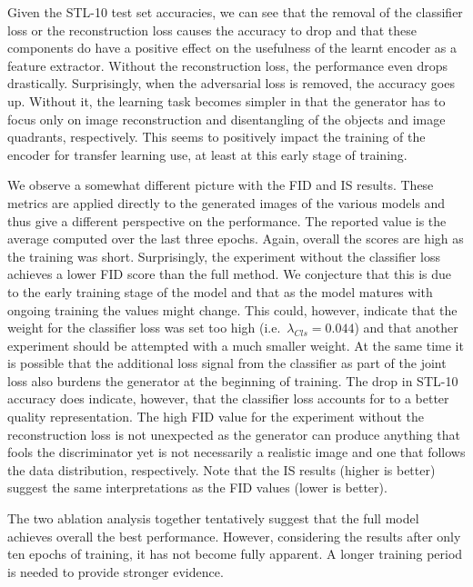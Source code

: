 \documentclass[a4paper,12pt]{report}
\begin{document}
Given the STL-10 test set accuracies, we can see that the removal of the classifier loss or the reconstruction loss causes the accuracy to drop and that these components do have a positive effect on the usefulness of the learnt encoder as a feature extractor. Without the reconstruction loss, the performance even drops drastically. Surprisingly, when the adversarial loss is removed, the accuracy goes up. Without it, the learning task becomes simpler in that the generator has to focus only on image reconstruction and disentangling of the objects and image quadrants, respectively. This seems to positively impact the training of the encoder for transfer learning use, at least at this early stage of training. 

We observe a somewhat different picture with the FID and IS results. These metrics are applied directly to the generated images of the various models and thus give a different perspective on the performance. The reported value is the average computed over the last three epochs. Again, overall the scores are high as the training was short. Surprisingly, the experiment without the classifier loss achieves a lower FID score than the full method. We conjecture that this is due to the early training stage of the model and that as the model matures with ongoing training the values might change. This could, however, indicate that the weight for the classifier loss was set too high (i.e.\ $\lambda_{Cls} = 0.044$) and that another experiment should be attempted with a much smaller weight. At the same time it is possible that the additional loss signal from the classifier as part of the joint loss also burdens the generator at the beginning of training. The drop in STL-10 accuracy does indicate, however, that the classifier loss accounts for to a better quality representation. The high FID value for the experiment without the reconstruction loss is not unexpected as the generator can produce anything that fools the discriminator yet is not necessarily a realistic image and one that follows the data distribution, respectively. Note that the IS results (higher is better) suggest the same interpretations as the FID values (lower is better).

\vspace{5mm}
The two ablation analysis together tentatively suggest that the full model achieves overall the best performance. However, considering the results after only ten epochs of training, it has not become fully apparent. A longer training period is needed to provide stronger evidence.
\end{document}
